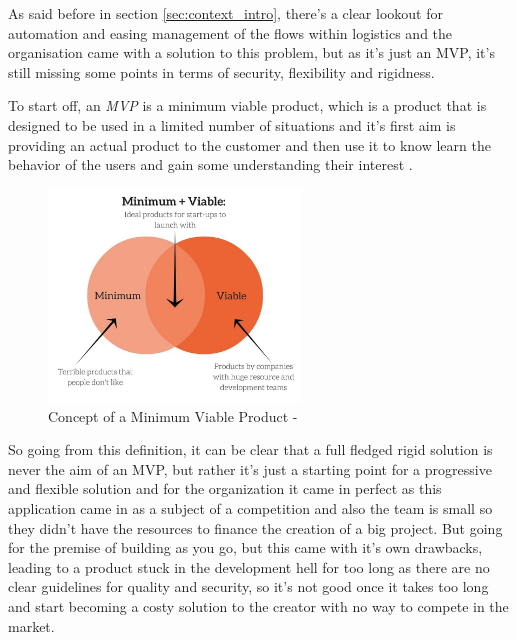As said before in section \ref{sec:context_intro}, there's a clear lookout for automation
and easing management of the flows within logistics and the organisation came with
a solution to this problem, but as it's just an MVP, it's still missing some points
in terms of security, flexibility and rigidness.

To start off, an \emph{MVP} is a minimum viable product, which is a product that
is designed to be used in a limited number of situations and it's first aim
is providing an actual product to the customer and then use it to know learn
the behavior of the users and gain some understanding their interest \cite{MVP_def}.

\begin{figure}[h]
    \centering
    \includegraphics[width=0.6\textwidth]{images/Minimum-Viable.jpg}
    \caption{\footnotesize{Concept of a Minimum Viable Product - \cite{MVP_def}}}
    \label{fig:mvp}
\end{figure}

So going from this definition, it can be clear that a full fledged rigid
solution is never the aim of an MVP, but rather it's just a starting point
for a progressive and flexible solution and for the organization it came in
perfect as this application came in as a subject of a competition and
also the team is small so they didn't have the resources to finance
the creation of a big project. But going for the premise of building as you go,
but this came with it's own drawbacks, leading to a product stuck in the development
hell for too long as there are no clear guidelines for quality and security, so it's
not good once it takes too long and start becoming a costy solution to the creator
with no way to compete in the market.

